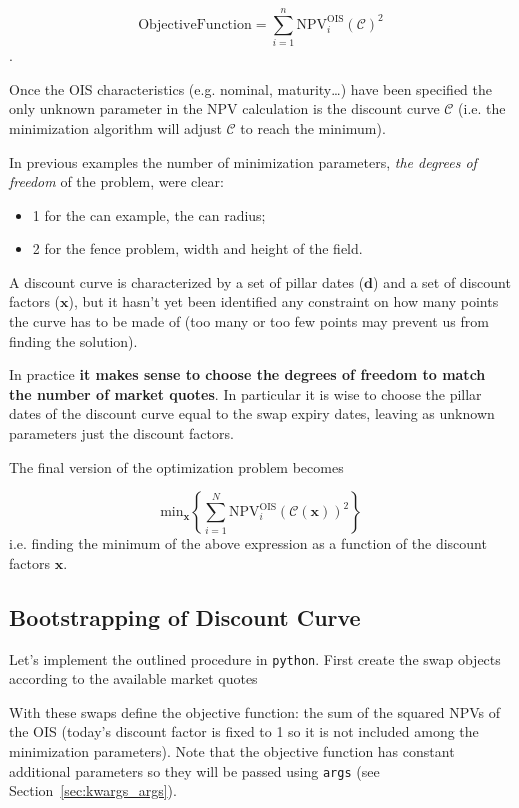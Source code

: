 \begin{equation}
\mathrm{Objective Function} = \sum_{i=1}^{n}\mathrm{NPV}^\mathrm{OIS}_i(\mathcal{C})^2
\end{equation}.

Once the OIS characteristics (e.g. nominal, maturity\ldots) have been specified the only unknown parameter in the NPV calculation is the discount curve $\mathcal{C}$ (i.e. the minimization algorithm will adjust $\mathcal{C}$ to reach the minimum).

In previous examples the number of minimization parameters, \emph{the degrees of freedom} of the problem, were clear:
\begin{itemize}
\item 1 for the can example, the can radius;
\item 2 for the fence problem, width and height of the field.
\end{itemize}

A discount curve is characterized by a set of pillar dates ($\mathbf{d}$) and a set of discount factors ($\mathbf{x}$), but it hasn't yet been identified any constraint on how many points the curve has to be made of (too many or too few points may prevent us from finding the solution).

In practice \textbf{it makes sense to choose the degrees of freedom to match the number of market quotes}. In particular it is wise to choose the pillar dates of the discount curve equal to the swap expiry dates, leaving as unknown parameters just the discount factors.

The final version of the optimization problem becomes

\begin{equation}
 \mathrm{min}_{\mathbf{x}} \left\{\sum_{i=1}^{N}\mathrm{NPV}^\mathrm{OIS}_i( \mathcal{C}(\mathbf{x}))^2\right\}
\end{equation}
i.e. finding the minimum of the above expression as a function of the discount factors $\mathbf{x}$.

\subsection{Bootstrapping of Discount Curve}
Let's implement the outlined procedure in \texttt{python}. First create the swap objects according to the available market quotes

With these swaps define the objective function: the sum of the squared NPVs of the OIS (today's discount factor is fixed to 1 so it is not included among the minimization parameters). Note that the objective function has constant additional parameters so they will be passed using \texttt{args} (see Section~\ref{sec:kwargs_args}). 

